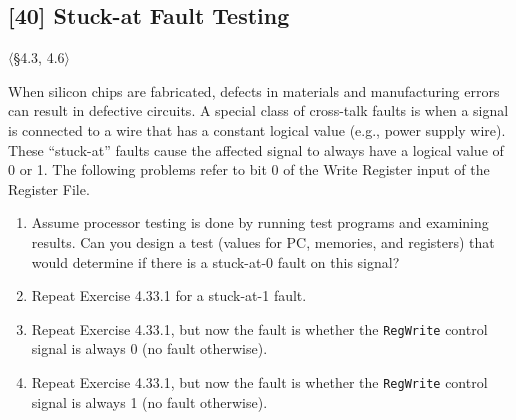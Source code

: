 \problembreak

\subsection{[40] Stuck-at Fault Testing}
\hypertarget{prob-4.33}{}
\noindent$\langle$\S4.3, 4.6$\rangle$\medskip

\noindent When silicon chips are fabricated, defects in materials and
manufacturing errors can result in defective circuits. A special class of
cross-talk faults is when a signal is connected to a wire that has a constant
logical value (e.g., power supply wire). These ``stuck-at'' faults cause the
affected signal to always have a logical value of 0 or 1. The following
problems refer to bit 0 of the Write Register input of the Register File.

\begin{enumerate}
  \item[4.33.1] [10] Assume processor testing is done by running test
        programs and examining results. Can you design a test (values for PC,
        memories, and registers) that would determine if there is a
        stuck-at-0 fault on this signal?
  \item[4.33.2] [10] Repeat Exercise 4.33.1 for a stuck-at-1 fault.
  \item[4.33.3] [10] Repeat Exercise 4.33.1, but now the fault is whether
        the \texttt{RegWrite} control signal is always 0 (no fault
        otherwise).
  \item[4.33.4] [10] Repeat Exercise 4.33.1, but now the fault is whether
        the \texttt{RegWrite} control signal is always 1 (no fault
        otherwise).
\end{enumerate}
